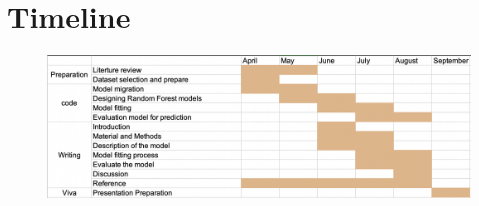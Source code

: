 \documentclass{article}
\begin{document}
\section{Timeline}

\begin{figure}
    \begin{center}
\centering
\includegraphics[scale= 0.5]{timeline.png}
\end{center}
\end{figure}

\newpage    

    
\end{document}
